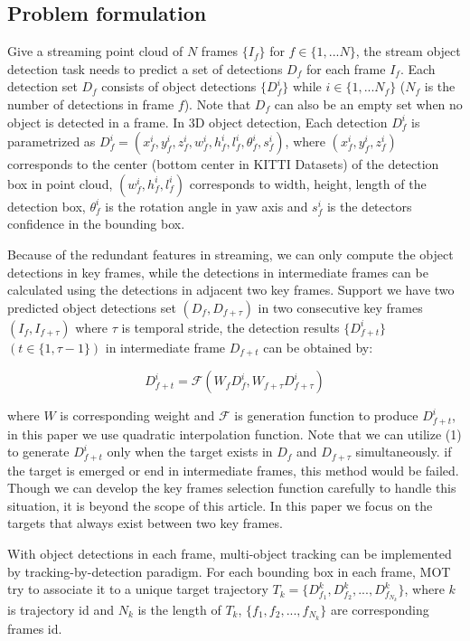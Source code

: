 \documentclass{bmvc2k}
\begin{document}
\subsection{Problem formulation}
Give a streaming point cloud of $N$ frames $\{I_f\}$ for $f \in \{1, ... N\}$, the stream object detection task needs to predict a set of detections $D_f$ for each frame $I_f$. Each detection set $D_f$ consists of object detections $\{D^i_f\}$ while $i \in \{1,...N_f\}$ ($N_f$ is the number of detections in frame $f$). Note that $D_f$ can also be an empty set when no object is detected in a frame. In 3D object detection, Each detection $D^i_f$ is parametrized as $D^i_f = (x^i_f, y^i_f, z^i_f, w^i_f, h^i_f, l^i_f, \theta^i_f, s^i_f)$, where $(x^i_f, y^i_f, z^i_f)$ corresponds to the center (bottom center in KITTI\cite{geiger2013vision} Datasets) of the detection box in point cloud, $(w^i_f, h^i_f, l^i_f)$ corresponds to width, height, length of the detection box, $\theta^i_f$ is the rotation angle in yaw axis and $s^i_f$ is the detectors confidence in the bounding box.

Because of the redundant features in streaming, we can only compute the object detections in key frames, while the detections in intermediate frames can be calculated using the detections in adjacent two key frames. Support we have two predicted object detections set $(D_f, D_{f+\tau})$ in two consecutive key frames $(I_f, I_{f+\tau})$ where $\tau$ is temporal stride, the detection results $\{D^i_{f+t}\}$ $(t \in \{1, \tau-1\})$ in intermediate frame $D_{f+t}$ can be obtained by:

\begin{equation}
D^i_{f+t} = \mathcal{F}(W_f D^i_f, W_{f+\tau} D^i_{f+\tau})
\end{equation}

where $W$ is corresponding weight and $\mathcal{F}$ is generation function to produce $D^i_{f+t}$, in this paper we use quadratic interpolation function. Note that we can utilize (1) to generate $D^i_{f+t}$ only when the target exists in $D_f$ and $D_{f+\tau}$ simultaneously. if the target is emerged or end in intermediate frames, this method would be failed. Though we can develop the key frames selection function carefully to handle this situation, it is beyond the scope of this article. In this paper we focus on the targets that always exist between two key frames.

With object detections in each frame, multi-object tracking can be implemented by tracking-by-detection paradigm. For each bounding box in each frame, MOT try to associate it to a unique target trajectory $T_k = \{D^k_{f_1}, D^k_{f_2}, ..., D^k_{f_{N_k}}\}$, where $k$ is trajectory id and $N_k$ is the length of $T_k$, $\{f_1, f_2, ..., f_{N_k}\}$ are corresponding frames id.
\end{document}
